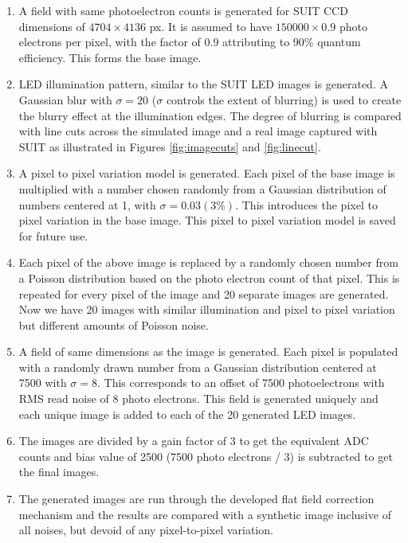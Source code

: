 \documentclass[11pt,a4paper]{article}
\begin{document}
				\begin{enumerate}
				\item A field with same photoelectron counts is generated for SUIT CCD dimensions of $4704 \times 4136$ px. It is assumed to have $150000 \times 0.9$ photo electrons per pixel, with the factor of 0.9 attributing to 90\% quantum efficiency. This forms the base image.
				
				\item LED illumination pattern, similar to the SUIT LED images is generated. A Gaussian blur with $\sigma=20$ ($\sigma$ controls the extent of blurring) is used to create the blurry effect at the illumination edges. The degree of blurring is compared with line cuts across the simulated image and a real image captured with SUIT as illustrated in  Figures \ref{fig:imagecuts} and \ref{fig:linecut}.
				
				\item A pixel to pixel variation model is generated. Each pixel of the base image is multiplied with a number chosen randomly from a Gaussian distribution of numbers centered at 1, with $\sigma=0.03 (3\%)$. This introduces the pixel to pixel variation in the base image. This pixel to pixel variation model is saved for future use.
				
				\item Each pixel of the above image is replaced by a randomly chosen number from a Poisson distribution based on the photo electron count of that pixel. This is repeated for every pixel of the image and 20 separate images are generated. Now we have 20 images with similar illumination and pixel to pixel variation but different amounts of Poisson noise.
				
				\item A field of same dimensions as the image is generated. Each pixel is populated with a randomly drawn number from a Gaussian distribution centered at 7500 with $\sigma= 8$. This corresponds to an offset of 7500 photoelectrons with RMS read noise of 8 photo electrons. This field is generated uniquely and each unique image is added to each of the 20 generated LED images.
				
				\item The images are divided by a gain factor of 3 to get the equivalent ADC counts and bias value of 2500 (7500 photo electrons / 3) is subtracted to get the final images.
				
				\item The generated images are run through the developed flat field correction mechanism and the results are compared with a synthetic image inclusive of all noises, but devoid of any pixel-to-pixel variation.
				

\end{enumerate}
\end{document}
